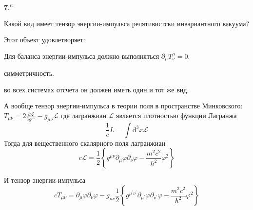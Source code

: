 \documentclass[a4paper,12pt]{article} %
\begin{document}
\begin{ttask} $\mathbf{7} .^{C}$ 

Какой вид имеет тензор энергии-импульса релятивистски инвариантного вакуума?


Этот объект удовлетворяет:


Для баланса энергии-импульса должно выполняться
$ \partial_\mu T^\mu_\nu=0.$


симметричность.

во всех системах отсчета он должен иметь один и тот же вид.



А вообще тензор энергии-импульса в теории поля в пространстве Минковского:
$T_{\mu \nu}=2 \frac{\partial \mathcal{L}}{\partial g^{\mu \nu}}-g_{\mu \nu} \mathcal{L}$
где лагранжиан $\mathcal{L}$ является плотностью функции Лагранжа
$$
\frac{1}{c} L=\int \mathrm{d}^{3} x \mathcal{L}
$$
Тогда для вещественного скалярного поля лагранжиан
$$
c \mathcal{L}
=
\frac{1}{2}\left\{
g^{\mu \nu} \partial_{\mu} \varphi \partial_{\nu} \varphi
-
\frac{m^{2} c^{2}}{\hbar^{2}} \varphi^{2}
\right\}
$$


И тензор энергии-импульса
$$
c T_{\mu \nu}
=
\partial_{\mu} \varphi \partial_{\nu} \varphi-g_{\mu \nu} \frac{1}{2}\left\{g^{\mu^{\prime} \nu^{\prime}} \partial_{\mu^{\prime}} \varphi \partial_{\nu^{\prime}} \varphi-\frac{m^{2} c^{2}}{\hbar^{2}} \varphi^{2}\right\}
$$











\end{ttask}
\end{document}
